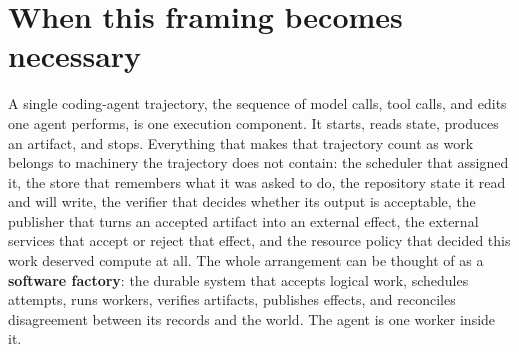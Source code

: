 \hypertarget{when-this-framing-becomes-necessary}{%
\section{When this framing becomes necessary}\label{when-this-framing-becomes-necessary}}

A single coding-agent trajectory, the sequence of model calls, tool calls, and edits one agent performs, is one execution component. It starts, reads state, produces an artifact, and stops. Everything that makes that trajectory count as work belongs to machinery the trajectory does not contain: the scheduler that assigned it, the store that remembers what it was asked to do, the repository state it read and will write, the verifier that decides whether its output is acceptable, the publisher that turns an accepted artifact into an external effect, the external services that accept or reject that effect, and the resource policy that decided this work deserved compute at all. The whole arrangement can be thought of as a \textbf{software factory}: the durable system that accepts logical work, schedules attempts, runs workers, verifies artifacts, publishes effects, and reconciles disagreement between its records and the world. The agent is one worker inside it.

